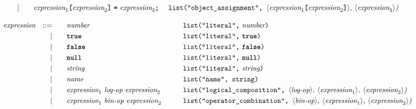 \begin{alignat*}{9}
&&                       && |   &\quad && \textit{expression}_1 \textbf{\texttt{[}}
                                          \textit{expression}_2 \textbf{\texttt{]}} \ 
                                           \textbf{\texttt{=}}\  \textit{expression}_3  \textbf{\texttt{;}}\ 
                                                           && \texttt{list("object\_assignment", } \langle \textit{expression}_1 \textbf{\texttt{[}} \textit{expression}_2 \textbf{\texttt{]}}  \rangle \textit{,  } \langle \textit{expression}_3\rangle \textit{)} 
\end{alignat*}

\begin{alignat*}{9}
  && \textit{expression}
                         && ::= &\quad && \textit{number}  && \texttt{list("literal",}\ \textit{number}\texttt{)} \\
&&                       && |   &\quad && \textbf{\texttt{true}}
                                                           && \texttt{list("literal",}\ \textbf{\texttt{true}}\texttt{)} \\
&&                       && |   &\quad && \textbf{\texttt{false}}
                                                           && \texttt{list("literal",}\ \textbf{\texttt{false}}\texttt{)} \\
&&                       && |   &\quad && \textbf{\texttt{null}}
                                                           && \texttt{list("literal",}\ \textbf{\texttt{null}}\texttt{)} \\
&&                       && |   &\quad &&  \textit{string}
                                                           && \texttt{list("literal",}\ \textit{string}\texttt{)} \\
&&                       && |   &\quad &&  \textit{name}   && \texttt{list("name", string)}  \\
&&                       && |   &\quad &&  \textit{expression}_1 \  \textit{log-op} \ 
                                            \textit{expression}_2 \qquad
                                                           && \texttt{list("logical\_composition",  } \langle \textit{log-op}\rangle \textit{, } \langle \textit{expression}_1\rangle \textit{, } \langle \textit{expression}_2\rangle \textit{)} \\
&&                       && |   &\quad &&  \textit{expression}_1 \  \textit{bin-op} \ 
                                            \textit{expression}_2 \qquad
                                                           && \texttt{list("operator\_combination",  } \langle \textit{bin-op}\rangle \textit{, } \langle \textit{expression}_1\rangle \textit{, } \langle \textit{expression}_2\rangle \textit{)} \\

\end{alignat*}
